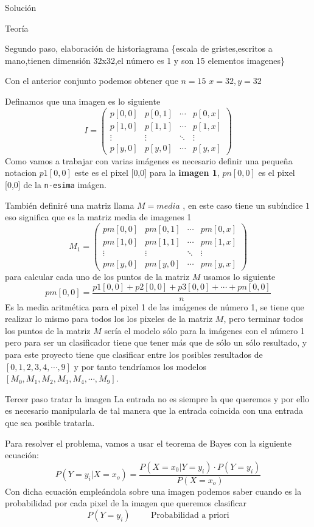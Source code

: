 \documentclass[
  spanish,
  ignorenonframetext,
]{beamer}
\begin{document}
\begin{frame}[fragile]{Solución}
\begin{block}{Teoría}
\begin{block}{Segundo paso, elaboración de historiagrama}
\{escala de gristes,escritos a mano,tienen dimensión 32x32,el número es
1 y son 15 elementos imagenes\}

Con el anterior conjunto podemos obtener que \(n=15\) \(x=32,y=32\)

Definamos que una imagen es lo siguiente \[
I=
\begin{pmatrix}
p[0,0] & p[0,1] & \cdots & p[0,x]\\
p[1,0] & p[1,1] & \cdots & p[1,x]\\
\vdots & \vdots & \ddots & \vdots\\
p[y,0] & p[y,0] & \cdots & p[y,x]
\end{pmatrix}
\] Como vamos a trabajar con varias imágenes es necesario definir una
pequeña notacion \(p1[0,0]\) este es el pixel {[}0,0{]} para la
\textbf{imagen 1}, \(pn[0,0]\) es el pixel {[}0,0{]} de la
\texttt{n-esima} imágen.

También definiré una matriz llama \(M=media\) , en este caso tiene un
subíndice \(1\) eso significa que es la matriz media de imagenes 1 \[
M_1=
\begin{pmatrix}
pm[0,0] & pm[0,1] & \cdots & pm[0,x]\\
pm[1,0] & pm[1,1] & \cdots & pm[1,x]\\
\vdots & \vdots & \ddots & \vdots\\
pm[y,0] & pm[y,0] & \cdots & pm[y,x]
\end{pmatrix}
\] para calcular cada uno de los puntos de la matriz \(M\) usamos lo
siguiente \[
pm[0,0]= \frac{p1[0,0]+ p2[0,0] + p3[0,0]+ \cdots + pn[0,0]}{n}
\] Es la media aritmética para el pixel 1 de las imágenes de número 1,
se tiene que realizar lo mismo para todos los los pixeles de la matriz
\(M\), pero terminar todos los puntos de la matriz \(M\) sería el modelo
sólo para la imágenes con el número 1 pero para ser un clasificador
tiene que tener más que de sólo un sólo resultado, y para este proyecto
tiene que clasificar entre los posibles resultados de
\([0,1,2,3,4,\cdots,9]\) y por tanto tendríamos los modelos
\([M_0,M_1,M_2,M_3,M_4,\cdots,M_9]\).
\end{block}

\begin{block}{Tercer paso tratar la imagen}
\protect\hypertarget{tercer-paso-tratar-la-imagen}{}
La entrada no es siempre la que queremos y por ello es necesario
manipularla de tal manera que la entrada coincida con una entrada que
sea posible tratarla.

Para resolver el problema, vamos a usar el teorema de Bayes con la
siguiente ecuación: \[
P(Y=y_i|X=x_o)= \frac{P(X=x_0| Y=y_i)\cdot P(Y=y_i)}{P(X=x_o)}
\] Con dicha ecuación empleándola sobre una imagen podemos saber cuando
es la probabilidad por cada pixel de la imagen que queremos clasificar
\[
P(Y=y_i) \hspace{1cm} \text{Probabilidad a priori}
\]


\end{block}
\end{block}
\end{frame}
\end{document}
